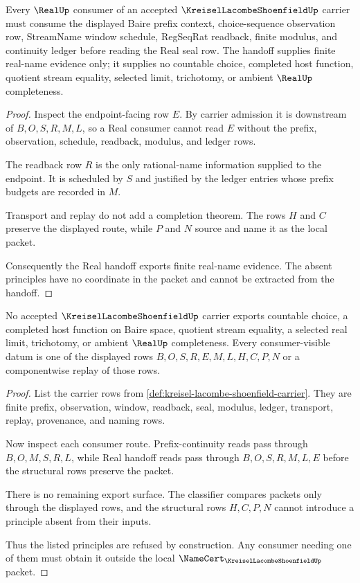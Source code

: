 \begin{theorem}\label{thm:kreisel-lacombe-shoenfield-real-handoff}
Every $\RealUp$ consumer of an accepted $\KreiselLacombeShoenfieldUp$ carrier must consume the displayed Baire prefix context, choice-sequence observation row, StreamName window schedule, RegSeqRat readback, finite modulus, and continuity ledger before reading the Real seal row. The handoff supplies finite real-name evidence only; it supplies no countable choice, completed host function, quotient stream equality, selected limit, trichotomy, or ambient $\RealUp$ completeness.
\end{theorem}
\begin{proof}
Inspect the endpoint-facing row $E$. By carrier admission it is downstream of $B,O,S,R,M,L$, so a Real consumer cannot read $E$ without the prefix, observation, schedule, readback, modulus, and ledger rows.

The readback row $R$ is the only rational-name information supplied to the endpoint. It is scheduled by $S$ and justified by the ledger entries whose prefix budgets are recorded in $M$.

Transport and replay do not add a completion theorem. The rows $H$ and $C$ preserve the displayed route, while $P$ and $N$ source and name it as the local packet.

Consequently the Real handoff exports finite real-name evidence. The absent principles have no coordinate in the packet and cannot be extracted from the handoff.
\end{proof}

\begin{theorem}\label{thm:kreisel-lacombe-shoenfield-nonescape}
No accepted $\KreiselLacombeShoenfieldUp$ carrier exports countable choice, a completed host function on Baire space, quotient stream equality, a selected real limit, trichotomy, or ambient $\RealUp$ completeness. Every consumer-visible datum is one of the displayed rows $B,O,S,R,E,M,L,H,C,P,N$ or a componentwise replay of those rows.
\end{theorem}
\begin{proof}
List the carrier rows from \autoref{def:kreisel-lacombe-shoenfield-carrier}. They are finite prefix, observation, window, readback, seal, modulus, ledger, transport, replay, provenance, and naming rows.

Now inspect each consumer route. Prefix-continuity reads pass through $B,O,M,S,R,L$, while Real handoff reads pass through $B,O,S,R,M,L,E$ before the structural rows preserve the packet.

There is no remaining export surface. The classifier compares packets only through the displayed rows, and the structural rows $H,C,P,N$ cannot introduce a principle absent from their inputs.

Thus the listed principles are refused by construction. Any consumer needing one of them must obtain it outside the local $\NameCert_{\KreiselLacombeShoenfieldUp}$ packet.
\end{proof}

